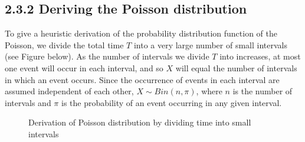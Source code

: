 \documentclass[letterpaper,10pt,english]{jupyterBook}
\let\sphinxpxdimen\pdfpxdimen\else\newdimen\sphinxpxdimen
\begin{document}
\noindent{}


\subsection{2.3.2 Deriving the Poisson distribution}
\label{\detokenize{02.d. Probability.Discrete:deriving-the-poisson-distribution}}
\sphinxAtStartPar
To give a heuristic derivation of the probability distribution function of the Poisson, we divide the total time \(T\) into a very large number of small intervals (see Figure below). As the number of intervals we divide \(T\) into increases, at most one event will occur in each interval, and so \(X\) will equal the number of intervals in which an event occurs. Since the occurrence of events in each interval are assumed independent of each other, \(X \sim Bin(n,\pi)\), where \(n\) is the number of intervals and \(\pi\) is the probability of an event occurring in any given interval.

\begin{figure}[htbp]
\centering
\capstart

\noindent\sphinxincludegraphics[height=300\sphinxpxdimen]{{poisson}.png}
\caption{Derivation of Poisson distribution by dividing time into small intervals}\label{\detokenize{02.d. Probability.Discrete:poisson}}\end{figure}
\end{document}
